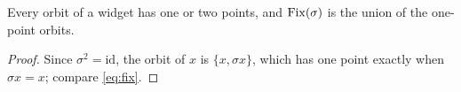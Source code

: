 
\begin{lemma}[Orbits]\label{dm-0002}\label{lem:orbits}
Every orbit of a widget has one or two points, and $\operatorname{Fix}(\sigma)$ is the union of the one-point orbits.
\end{lemma}
\begin{proof}
Since $\sigma^2=\mathrm{id}$, the orbit of $x$ is $\{x,\sigma x\}$, which has one point exactly when $\sigma x = x$; compare \eqref{eq:fix}.
\end{proof}
